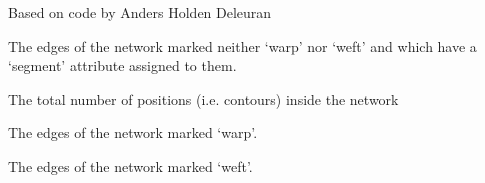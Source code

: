 \documentclass[letterpaper,10pt,english]{sphinxmanual}
\begin{document}
\begin{fulllineitems}
\begin{fulllineitems}
Based on code by Anders Holden Deleuran

\end{fulllineitems}


\begin{fulllineitems}
\label{\detokenize{cockatoo:cockatoo.KnitNetworkBase.segment_contour_edges}}
The edges of the network marked neither ‘warp’ nor ‘weft’ and which have a ‘segment’ attribute assigned to them.

\end{fulllineitems}


\begin{fulllineitems}
\label{\detokenize{cockatoo:cockatoo.KnitNetworkBase.total_positions}}
The total number of positions (i.e. contours) inside the network

\end{fulllineitems}


\begin{fulllineitems}
\label{\detokenize{cockatoo:cockatoo.KnitNetworkBase.warp_edges}}
The edges of the network marked ‘warp’.

\end{fulllineitems}


\begin{fulllineitems}
\label{\detokenize{cockatoo:cockatoo.KnitNetworkBase.weft_edges}}
The edges of the network marked ‘weft’.

\end{fulllineitems}


\end{fulllineitems}
\end{document}
